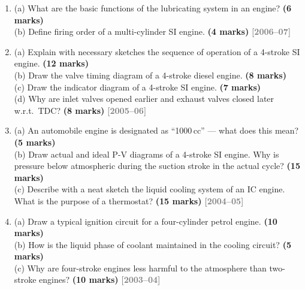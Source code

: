 \documentclass[12pt,a3paper]{article}
\newcommand{\yr}[1]{\hfill\textcolor{gray}{\small\textbf{[#1]}}}
\newcommand{\mk}[1]{\textcolor{orange!70!black}{\small\textbf{(#1 marks)}}}
\begin{document}
\begin{enumerate}
\item \label{qlabel:A2-Q29}
(a) What are the basic functions of the lubricating system in an engine? \mk{6}\\
(b) Define firing order of a multi-cylinder SI engine. \mk{4}
\yr{2006--07}




\item \label{qlabel:A2-Q26}
(a) Explain with necessary sketches the sequence of operation of a 4-stroke SI engine. \mk{12}\\
(b) Draw the valve timing diagram of a 4-stroke diesel engine. \mk{8}\\
(c) Draw the indicator diagram of a 4-stroke SI engine. \mk{7}\\
(d) Why are inlet valves opened earlier and exhaust valves closed later w.r.t.\ TDC? \mk{8}
\yr{2005--06}




\item \label{qlabel:A2-Q27}
(a) An automobile engine is designated as ``1000\,cc'' --- what does this mean? \mk{5}\\
(b) Draw actual and ideal P-V diagrams of a 4-stroke SI engine. Why is pressure below atmospheric during the suction stroke in the actual cycle? \mk{15}\\
(c) Describe with a neat sketch the liquid cooling system of an IC engine. What is the purpose of a thermostat? \mk{15}
\yr{2004--05}




\item \label{qlabel:A2-Q28}
(a) Draw a typical ignition circuit for a four-cylinder petrol engine. \mk{10}\\
(b) How is the liquid phase of coolant maintained in the cooling circuit? \mk{5}\\
(c) Why are four-stroke engines less harmful to the atmosphere than two-stroke engines? \mk{10}
\yr{2003--04}






\end{enumerate}
\end{document}
